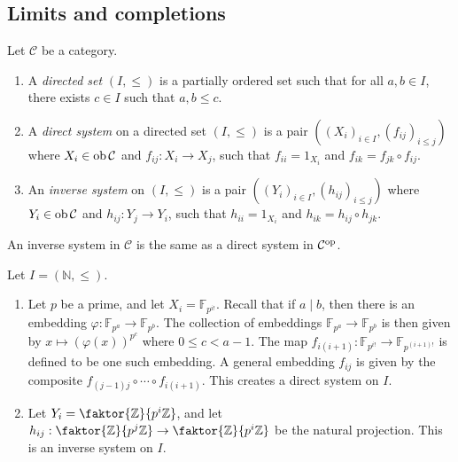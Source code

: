 \subsection{Limits and completions}
\begin{definition}
    Let \( \mathcal C \) be a category.
    \begin{enumerate}
        \item A \emph{directed set} \( (I, \leq) \) is a partially ordered set such that for all \( a, b \in I \), there exists \( c \in I \) such that \( a, b \leq c \).
        \item A \emph{direct system} on a directed set \( (I, \leq) \) is a pair \( ((X_i)_{i \in I}, (f_{ij})_{i \leq j}) \) where \( X_i \in \operatorname{ob} \mathcal C \) and \( f_{ij} : X_i \to X_j \), such that \( f_{ii} = 1_{X_i} \) and \( f_{ik} = f_{jk} \circ f_{ij} \).
        \item An \emph{inverse system} on \( (I, \leq) \) is a pair \( ((Y_i)_{i \in I}, (h_{ij})_{i \leq j}) \) where \( Y_i \in \operatorname{ob} \mathcal C \) and \( h_{ij} : Y_j \to Y_i \), such that \( h_{ii} = 1_{X_i} \) and \( h_{ik} = h_{ij} \circ h_{jk} \).
    \end{enumerate}
\end{definition}
\begin{remark}
    An inverse system in \( \mathcal C \) is the same as a direct system in \( \mathcal C^{\mathrm{op}} \).
\end{remark}
\begin{example}
    Let \( I = (\mathbb N, \leq) \).
    \begin{enumerate}
        \item Let \( p \) be a prime, and let \( X_i = \mathbb F_{p^{i!}} \).
        Recall that if \( a \mid b \), then there is an embedding \( \varphi : \mathbb F_{p^a} \to \mathbb F_{p^b} \).
        The collection of embeddings \( \mathbb F_{p^a} \to \mathbb F_{p^b} \) is then given by \( x \mapsto (\varphi(x))^{p^c} \) where \( 0 \leq c < a - 1 \).
        The map \( f_{i(i+1)} : \mathbb F_{p^{i!}} \to \mathbb F_{p^{(i+1)!}} \) is defined to be one such embedding.
        A general embedding \( f_{ij} \) is given by the composite \( f_{(j-1)j} \circ \cdots \circ f_{i(i+1)} \).
        This creates a direct system on \( I \).
        \item Let \( Y_i = \faktor{\mathbb Z}{p^i \mathbb Z} \), and let \( h_{ij} : \faktor{\mathbb Z}{p^j \mathbb Z} \to \faktor{\mathbb Z}{p^i \mathbb Z} \) be the natural projection.
        This is an inverse system on \( I \).
    \end{enumerate}
\end{example}
